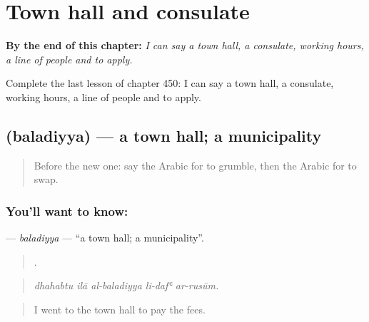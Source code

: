 
\chapter{Town hall and consulate}
\label{ch:ar-town-hall-and-consulate}

\begin{chapteropening}
\textbf{By the end of this chapter:} \emph{I can say a town hall, a consulate, working hours, a line of people and to apply.}

Complete the last lesson of chapter 450: I can say a town hall, a consulate, working hours, a line of people and to apply.
\end{chapteropening}

\section[\texorpdfstring{\ar{بلدية} (baladiyya)}{بلدية (baladiyya)}]{ (baladiyya) — a town hall; a municipality}

\label{lesson:AR-C450-baladiyya}



\begin{quote}
Before the new one: say the Arabic for to grumble, then the Arabic for to swap.
\end{quote}

\subsection*{You'll want to know: }
\textbf{} — \emph{baladiyya} — \textquotedblleft{}a town hall; a municipality\textquotedblright{}.

\begin{quote}
    .
\end{quote}

\begin{quote}
\emph{dhahabtu ilā al-baladiyya li-dafʿ ar-rusūm.}
\end{quote}

\begin{quote}
I went to the town hall to pay the fees.
\end{quote}

